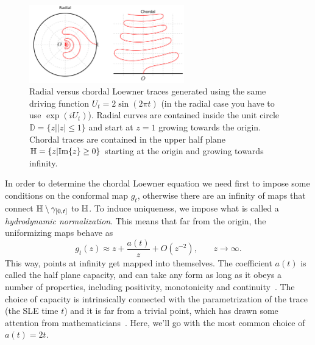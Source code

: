 \begin{figure}[t]
\begin{center}
    \includegraphics[width=0.6\textwidth]{chapters/ch4-sle/figs/radchord}
\end{center}
\caption{Radial versus chordal Loewner traces generated using the same driving
    function $U_t=2\sin(2\pi t)$ (in the radial case you have to use
    $\exp(iU_t)$). Radial curves are contained inside the unit circle
    $\mathbb{D}=\{z||z|\leq1\}$ and start at $z=1$ growing towards the origin.
    Chordal traces are contained in the upper half plane
    $\mathbb{H}=\{z|\mbox{Im}\{z\}\geq0\}$ starting at the origin and growing towards
    infinity.}
\label{fig:radchord}
\end{figure}


In order to determine the chordal Loewner equation we need first to impose some
conditions on the conformal map $g_t$, otherwise there are an infinity of maps
that connect $\mathbb{H}\setminus\gamma_{[0,t]}$ to $\mathbb{H}$. To induce uniqueness, we
impose what is called a \textit{hydrodynamic normalization}. This means that
far from the origin, the uniformizing maps behave as
\begin{equation}
    \label{eq:hydro}
    g_{t}\left(z\right)\approx
    z+\frac{a\left(t\right)}{z}+O\left(z^{-2}\right)
    ,\,\,\,\,\,\,\,\,\,\,\,
    z\rightarrow\infty.
\end{equation}
This way, points at infinity get mapped into themselves. The coefficient $a(t)$
is called the half plane capacity, and can take any form as long as it obeys a
number of properties, including positivity, monotonicity and
continuity~\cite{Kager2004}. The choice of capacity is intrinsically connected
with the parametrization of the trace (the SLE time $t$) and it is far from a
trivial point, which has drawn some attention from
mathematicians~\cite{Lawler2011}. Here, we'll go with the most common choice of
$a(t)=2t$.

